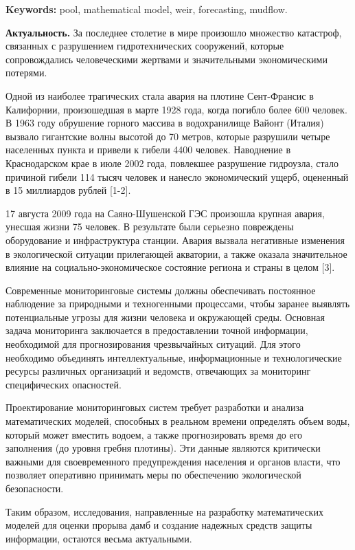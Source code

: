 {{\bfseries Keywords:} pool, mathematical model, weir, forecasting, mudflow.

{\bfseries Актуальность.} За последнее столетие в мире произошло множество
катастроф, связанных с разрушением гидротехнических сооружений, которые
сопровождались человеческими жертвами и значительными экономическими
потерями.

Одной из наиболее трагических стала авария на плотине Сент-Франсис в
Калифорнии, произошедшая в марте 1928 года, когда погибло более 600
человек. В 1963 году обрушение горного массива в водохранилище Вайонт
(Италия) вызвало гигантские волны высотой до 70 метров, которые
разрушили четыре населенных пункта и привели к гибели 4400 человек.
Наводнение в Краснодарском крае в июле 2002 года, повлекшее разрушение
гидроузла, стало причиной гибели 114 тысяч человек и нанесло
экономический ущерб, оцененный в 15 миллиардов рублей {[}1-2{]}.

17 августа 2009 года на Саяно-Шушенской ГЭС произошла крупная авария,
унесшая жизни 75 человек. В результате были серьезно повреждены
оборудование и инфраструктура станции. Авария вызвала негативные
изменения в экологической ситуации прилегающей акватории, а также
оказала значительное влияние на социально-экономическое состояние
региона и страны в целом {[}3{]}.

Современные мониторинговые системы должны обеспечивать постоянное
наблюдение за природными и техногенными процессами, чтобы заранее
выявлять потенциальные угрозы для жизни человека и окружающей среды.
Основная задача мониторинга заключается в предоставлении точной
информации, необходимой для прогнозирования чрезвычайных ситуаций. Для
этого необходимо объединять интеллектуальные, информационные и
технологические ресурсы различных организаций и ведомств, отвечающих за
мониторинг специфических опасностей.

Проектирование мониторинговых систем требует разработки и анализа
математических моделей, способных в реальном времени определять объем
воды, который может вместить водоем, а также прогнозировать время до его
заполнения (до уровня гребня плотины). Эти данные являются критически
важными для своевременного предупреждения населения и органов власти,
что позволяет оперативно принимать меры по обеспечению экологической
безопасности.

Таким образом, исследования, направленные на разработку математических
моделей для оценки прорыва дамб и создание надежных средств защиты
информации, остаются весьма актуальными.

}
